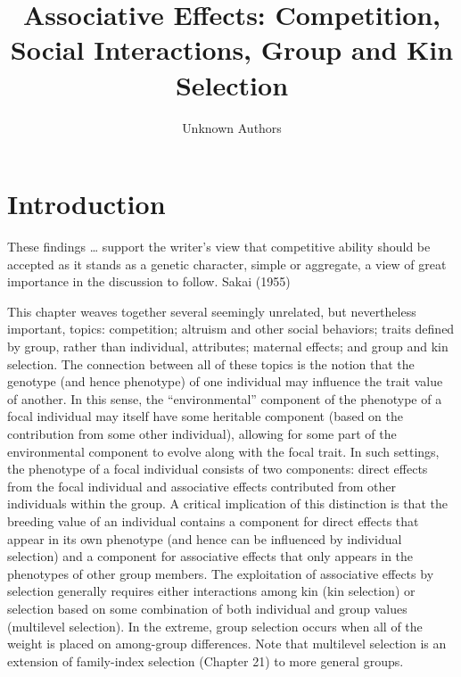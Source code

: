 \documentclass{article}
\title{Associative Effects: Competition, Social Interactions, Group and Kin Selection}
\author{Unknown Authors}
\date{}
\begin{document}
\maketitle

\begin{abstract}

\end{abstract}

\section{Introduction}
These findings … support the writer's view that competitive ability should be accepted as it stands as a genetic character, simple or aggregate, a view of great importance in the discussion to follow. Sakai (1955)

This chapter weaves together several seemingly unrelated, but nevertheless important, topics: competition; altruism and other social behaviors; traits defined by group, rather than individual, attributes; maternal effects; and group and kin selection. The connection between all of these topics is the notion that the genotype (and hence phenotype) of one individual may influence the trait value of another. In this sense, the “environmental” component of the phenotype of a focal individual may itself have some heritable component (based on the contribution from some other individual), allowing for some part of the environmental component to evolve along with the focal trait. In such settings, the phenotype of a focal individual consists of two components: direct effects from the focal individual and associative effects contributed from other individuals within the group. A critical implication of this distinction is that the breeding value of an individual contains a component for direct effects that appear in its own phenotype (and hence can be influenced by individual selection) and a component for associative effects that only appears in the phenotypes of other group members. The exploitation of associative effects by selection generally requires either interactions among kin (kin selection) or selection based on some combination of both individual and group values (multilevel selection). In the extreme, group selection occurs when all of the weight is placed on among-group differences. Note that multilevel selection is an extension of family-index selection (Chapter 21) to more general groups.
\end{document}
